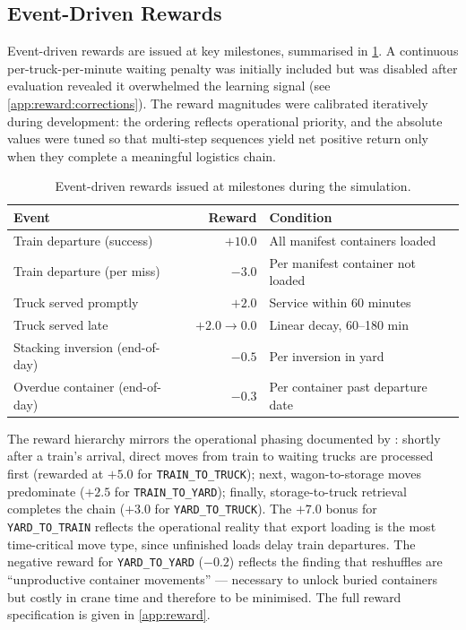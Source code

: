 \subsection{Event-Driven Rewards}
\label{sec:sys:reward:events}

Event-driven rewards are issued at key milestones, summarised in \cref{tab:sys:event_rewards}. A continuous per-truck-per-minute waiting penalty was initially included but was disabled after evaluation revealed it overwhelmed the learning signal (see \cref{app:reward:corrections}). The reward magnitudes were calibrated iteratively during development: the ordering reflects operational priority, and the absolute values were tuned so that multi-step sequences yield net positive return only when they complete a meaningful logistics chain.

\begin{table}[H]
  \centering
  \caption{Event-driven rewards issued at milestones during the simulation.}
  \label{tab:sys:event_rewards}
  \begin{tabular}{@{} l r l @{}}
    \toprule
    \textbf{Event} & \textbf{Reward} & \textbf{Condition} \\
    \midrule
    Train departure (success)   & $+10.0$ & All manifest containers loaded \\
    Train departure (per miss)  & $-3.0$  & Per manifest container not loaded \\
    Truck served promptly       & $+2.0$  & Service within 60 minutes \\
    Truck served late           & $+2.0 \to 0.0$ & Linear decay, 60--180 min \\
    \midrule
    Stacking inversion (end-of-day) & $-0.5$ & Per inversion in yard \\
    Overdue container (end-of-day) & $-0.3$ & Per container past departure date \\
    \bottomrule
  \end{tabular}
\end{table}

The reward hierarchy mirrors the operational phasing documented by \textcite{boysen2013container}: shortly after a train's arrival, direct moves from train to waiting trucks are processed first (rewarded at $+5.0$ for \texttt{TRAIN\_TO\_TRUCK}); next, wagon-to-storage moves predominate ($+2.5$ for \texttt{TRAIN\_TO\_YARD}); finally, storage-to-truck retrieval completes the chain ($+3.0$ for \texttt{YARD\_TO\_TRUCK}). The $+7.0$ bonus for \texttt{YARD\_TO\_TRAIN} reflects the operational reality that export loading is the most time-critical move type, since unfinished loads delay train departures. The negative reward for \texttt{YARD\_TO\_YARD} ($-0.2$) reflects the finding that reshuffles are ``unproductive container movements'' \cite{vis2003transshipment} --- necessary to unlock buried containers but costly in crane time and therefore to be minimised. The full reward specification is given in \cref{app:reward}.

